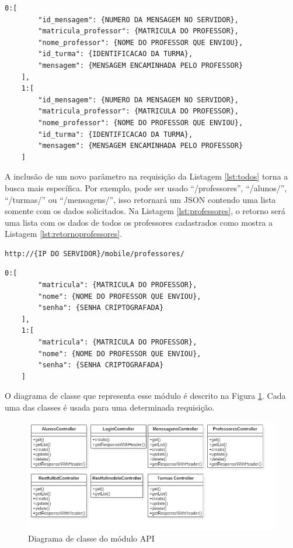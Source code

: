 \begin{lstlisting}[caption={Retorno da requisição \ref{lst:todos}},label={lst:retornotodos}]
	0:[
		"id_mensagem": {NUMERO DA MENSAGEM NO SERVIDOR},
		"matricula_professor": {MATRICULA DO PROFESSOR},
		"nome_professor": {NOME DO PROFESSOR QUE ENVIOU},
		"id_turma": {IDENTIFICACAO DA TURMA},
		"mensagem": {MENSAGEM ENCAMINHADA PELO PROFESSOR}
	],
	1:[		
		"id_mensagem": {NUMERO DA MENSAGEM NO SERVIDOR},
		"matricula_professor": {MATRICULA DO PROFESSOR},
		"nome_professor": {NOME DO PROFESSOR QUE ENVIOU},
		"id_turma": {IDENTIFICACAO DA TURMA},
		"mensagem": {MENSAGEM ENCAMINHADA PELO PROFESSOR}
	]
\end{lstlisting}

A inclusão de um novo parâmetro na requisição da Listagem \ref{lst:todos} torna a busca mais específica. Por exemplo, pode ser usado ``/professores'', ``/alunos/'', ``/turmas/'' ou ``/mensagens/'', isso retornará um JSON contendo uma lista somente com os dados solicitados. Na Listagem \ref{lst:professores}, o retorno será uma lista com os dados de todos os professores cadastrados como mostra a Listagem \ref{lst:retornoprofessores}.

\begin{lstlisting}[caption={Requisitar lista de dados especifica},label={lst:professores}]
	http://{IP DO SERVIDOR}/mobile/professores/
\end{lstlisting}

\begin{lstlisting}[caption={Retorno da requisição \ref{lst:bd}},label={lst:retornoprofessores},float]
	0:[
		"matricula": {MATRICULA DO PROFESSOR},
		"nome": {NOME DO PROFESSOR QUE ENVIOU},
		"senha": {SENHA CRIPTOGRAFADA}
	],
	1:[		
		"matricula": {MATRICULA DO PROFESSOR},
		"nome": {NOME DO PROFESSOR QUE ENVIOU},
		"senha": {SENHA CRIPTOGRAFADA}
	]
\end{lstlisting}

O diagrama de classe que representa esse módulo é descrito na Figura \ref{fig:diagramaclasseAPI}. Cada uma das classes é usada para uma determinada requisição.
\begin{figure}[H]
\centering
\includegraphics[width=\textwidth]{figuras/diagramaclasseAPI}
\caption{Diagrama de classe do módulo API}
\label{fig:diagramaclasseAPI}
\end{figure}

